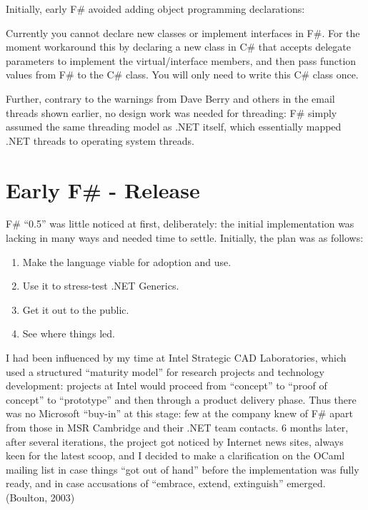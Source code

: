 \documentclass[acmsmall]{acmart}\settopmatter{}
\begin{document}
Initially, early F\# avoided adding object programming declarations:
\begin{verbquote}
Currently you cannot declare new classes or implement interfaces in F#.  For the moment workaround this by declaring a new class in C# that accepts delegate parameters to implement the virtual/interface members, and then pass function values from F# to the C# class.  You will only need to write this C# class once.
\end{verbquote}

Further, contrary to the warnings from Dave Berry and others in the email threads shown earlier, no design work was needed for threading: F\# simply assumed the same threading model as .NET itself, which essentially mapped .NET threads to operating system threads.



\section*{Early F\# - Release}


F\# “0.5” was little noticed at first, deliberately: the initial implementation was lacking in many ways and needed time to settle. Initially, the plan was as follows: 
\begin{enumerate}
\item Make the language viable for adoption and use.
\item Use it to stress-test .NET Generics.
\item Get it out to the public.
\item See where things led.
\end{enumerate}

I had been influenced by my time at Intel Strategic CAD Laboratories, which used a structured “maturity model” for research projects and technology development: projects at Intel would proceed from “concept” to “proof of concept” to “prototype” and then through a product delivery phase. Thus there was no Microsoft “buy-in” at this stage: few at the company knew of F\# apart from those in MSR Cambridge and their .NET team contacts. 6 months later, after several iterations, the project got noticed by Internet news sites, always keen for the latest scoop, and I decided to make a clarification on the OCaml mailing list in case things “got out of hand” before the implementation was fully ready, and in case accusations of “embrace, extend, extinguish” emerged. (Boulton, 2003)
\end{document}
